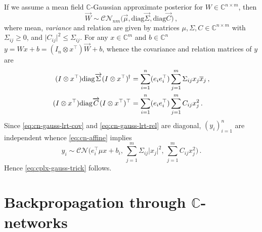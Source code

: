 \documentclass[a4paper,10pt,twocolumn]{article}
\newcommand{\cplx}{\mathbb{C}}
\newcommand{\hop}{{\mkern-1.5mu\dagger}}
\newcommand{\conj}[1]{\overline{#1}}
\renewcommand{\vec}[1]{\overrightarrow{#1}}
\newcommand{\diag}[1]{\mathrm{diag}{#1}}
\begin{document}
If we assume a mean field $\cplx$-Gaussian approximate posterior for $
  W \in \cplx^{n\times m}
$, then
\begin{equation}  \label{eq:c-gauss-vi-general-vec}
  \vec{W}
    \sim \mathcal{C}\mathcal{N}_{nm} \bigl(
      \vec{\mu}, \diag{\vec{\Sigma}}, \diag{\vec{C}}
    \bigr)
  \,,
\end{equation}
where mean, \emph{variance} and relation are given by matrices $
  \mu, \Sigma, C \in \cplx^{n\times m}
$ with $\Sigma_{ij} \geq 0$, and $
  \lvert C_{ij} \rvert^2 \leq \Sigma_{ij}
$. For any $x \in \cplx^m$ and $b\in \cplx^n$ $
  y = W x + b
    = (I_n \otimes x^\top) \vec{W} + b
$, whence the covariance and relation matrices of $y$ are
\begin{align}
  (I \otimes x^\top) \diag{\vec{\Sigma}} (I \otimes x^\top)^{\hop}
    & = \sum_{i=1}^n (e_i e_i^\top) \sum_{j=1}^m \Sigma_{ij} x_j \conj{x}_j
    \,,  \label{eq:cn-gauss-lrt-cov} \\
  (I \otimes x^\top) \diag{\vec{C}} (I \otimes x^\top)^\top
    & = \sum_{i=1}^n (e_i e_i^\top) \sum_{j=1}^m C_{ij} x_j^2
    \,.  \label{eq:cn-gauss-lrt-rel}
\end{align}
Since \eqref{eq:cn-gauss-lrt-cov} and \eqref{eq:cn-gauss-lrt-rel} are diagonal, $(y_i)_{i=1}^n$
are independent whence \eqref{eq:cn-affine} implies
\begin{equation}  \label{eq:cplx-gauss-trick-appendix}
  y_i
    \sim \mathcal{CN}
      \bigl(
        e_i^\top \mu x + b_i,
        \, \sum_{j=1}^m \Sigma_{ij} \lvert x_j \rvert^2,
        \, \sum_{j=1}^m C_{ij} x_j^2
      \bigr)
    \,.
\end{equation}
Hence \eqref{eq:cplx-gauss-trick} follows.


\section{Backpropagation through $\cplx$-networks} %
\label{sub:wirtinger_calculus}
\end{document}
